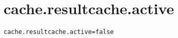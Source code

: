 \section{cache.resultcache.active}
\label{configuration:CacheResultcacheActive}
\ClearAPI
\TODO
{}
\begin{lstlisting}[style=Props,caption={Usage example for \textit{cache.resultcache.active}}]
cache.resultcache.active=false
\end{lstlisting}